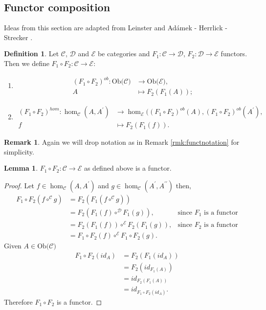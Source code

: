 \documentclass[11pt,a4paper]{article}
\theoremstyle{definition}
\newtheorem{lemma}[thm]{Lemma}
\newtheorem{definition}[thm]{Definition}
\newtheorem{remark}[thm]{Remark}
\newcommand\ho[3][]{\hom_{#1}(#2,#3)}
\newcommand\ob[1]{\mathrm{Ob(}#1\mathrm{)}}
\newcommand\cat[1]{\mathscr{#1}}
\numberwithin{equation}{section}
\begin{document}
\subsection{Functor composition}
\label{ss:functcomp} 
Ideas from this section are adapted from Leinster \cite{Leinster} and Adámek - Herrlick - Strecker \cite{ACC}.
\begin{definition}
\label{def:functcomp}
Let $\mathscr{C}$, $\mathscr{D}$ and $\mathscr{E}$ be categories and $F_{1}\colon\mathscr{C}\rightarrow\mathscr{D}$, $F_{2}\colon\mathscr{D}\rightarrow\mathscr{E}$ functors. Then we define $F_{1}\circ F_{2}\colon\mathscr{C}\rightarrow\mathscr{E}$:
\begin{enumerate}
    \item \begin{align*}
    (F_{1}\circ F_{2})^{ob}\colon\ob{\mathscr{C}}&\rightarrow\ob{\mathscr{E}},\\
    A&\mapsto F_{2}(F_{1}(A));
    \end{align*}
    \item \begin{align*}
        (F_{1}\circ F_{2})^{hom}\colon\ho[\mathscr{C}]{A}{A^{\prime}}&\rightarrow\ho[\mathscr{E}]{(F_{1}\circ F_{2})^{ob}(A)}{(F_{1}\circ F_{2})^{ob}(A^{\prime}},\\
        f&\mapsto F_{2}(F_{1}(f)).
    \end{align*}
\end{enumerate}
\end{definition}
\begin{remark}
Again we will drop notation as in Remark \ref{rmk:functnotation} for simplicity.
\end{remark}
\begin{lemma}
$F_{1}\circ F_{2}\colon\mathscr{C}\rightarrow\mathscr{E}$ as defined above is a functor.
\end{lemma}
\begin{proof}
Let $f\in\ho[\cat{C}]{A}{A^{\prime}}$ and $g\in\ho[\cat{C}]{A^{\prime}}{A^{\prime\prime}}$ then,
\begin{align*}
    F_{1}\circ F_{2}(f\circ^{\mathscr{C}} g) &= F_{2}(F_{1}(f\circ^{\mathscr{C}}g))\\
    &= F_{2}(F_{1}(f)\circ^{\mathscr{D}}F_{1}(g)), &\text{since $F_{1}$ is a functor}\\
    &= F_{2}(F_{1}(f))\circ^{\mathscr{E}}F_{2}(F_{1}(g)), &\text{since $F_{2}$ is a functor}\\
    &= F_{1}\circ F_{2}(f) \circ^{\mathscr{E}}F_{1}\circ F_{2}(g).
\end{align*}
Given $A\in\ob{\mathscr{C}}$
\begin{align*}
    F_{1}\circ F_{2}(id_{A}) &= F_{2}(F_{1}(id_{A}))\\
    &= F_{2}(id_{F_{1}(A)})\\
    &= id_{F_{2}(F_{1}(A))}\\
    &= id_{F_{1}\circ F_{2}(id_{A})}.
\end{align*}
Therefore $F_{1}\circ F_{2}$ is a functor.
\end{proof}
\end{document}
